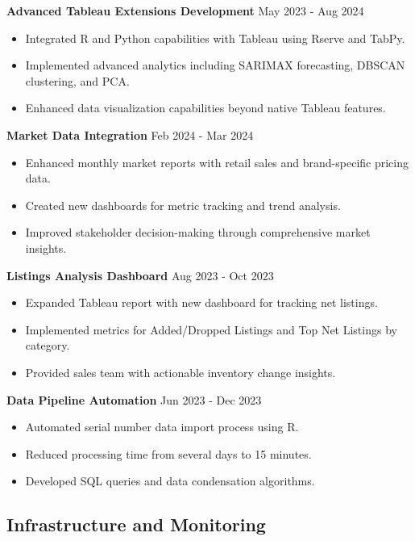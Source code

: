 \documentclass[a4paper,10pt]{article}
\begin{document}
\textbf{Advanced Tableau Extensions Development} \hfill May 2023 - Aug 2024
\begin{itemize}[noitemsep, topsep=0pt]
    \item Integrated R and Python capabilities with Tableau using Rserve and TabPy.
    \item Implemented advanced analytics including SARIMAX forecasting, DBSCAN clustering, and PCA.
    \item Enhanced data visualization capabilities beyond native Tableau features.
\end{itemize}
\textbf{Market Data Integration} \hfill Feb 2024 - Mar 2024
\begin{itemize}[noitemsep, topsep=0pt]
    \item Enhanced monthly market reports with retail sales and brand-specific pricing data.
    \item Created new dashboards for metric tracking and trend analysis.
    \item Improved stakeholder decision-making through comprehensive market insights.
\end{itemize}
\textbf{Listings Analysis Dashboard} \hfill Aug 2023 - Oct 2023
\begin{itemize}[noitemsep, topsep=0pt]
    \item Expanded Tableau report with new dashboard for tracking net listings.
    \item Implemented metrics for Added/Dropped Listings and Top Net Listings by category.
    \item Provided sales team with actionable inventory change insights.
\end{itemize}
\textbf{Data Pipeline Automation} \hfill Jun 2023 - Dec 2023
\begin{itemize}[noitemsep, topsep=0pt]
    \item Automated serial number data import process using R.
    \item Reduced processing time from several days to 15 minutes.
    \item Developed SQL queries and data condensation algorithms.
\end{itemize}

\subsection*{Infrastructure and Monitoring}
\end{document}
